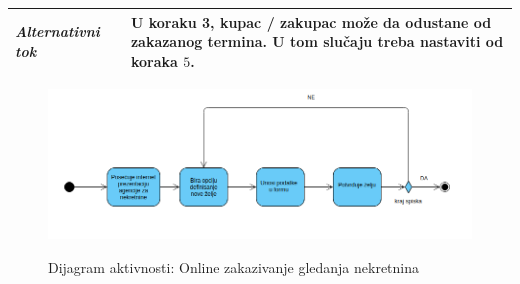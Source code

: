 \documentclass[20pt]{article}
\begin{document}
\begin{center}
\begin{tabular}{p{0.23\linewidth} p{0.77\linewidth}}
 {\it \bfseries Alternativni tok} & U koraku 3, kupac / zakupac mo\v ze da odustane od zakazanog termina. U tom slu\v caju treba nastaviti od koraka $5$.\\
 \hline
 
\end{tabular}
\end{center}

\begin{figure}[h]
        \centering
        \includegraphics[width=1.1\textwidth,height=0.35\textheight] {Pictures/DijagramAktivnostiOnlineZakazivanjeGledanja.png}\\
        \caption{Dijagram aktivnosti: Online zakazivanje gledanja nekretnina}
        \label{fig:dijagramAktivnostiOnlineZakazivanjeGledanja}
    \end{figure}

\newpage
{}
\setlength{\parindent}{1cm}
\fontsize{13}{18} \selectfont 
\end{document}
